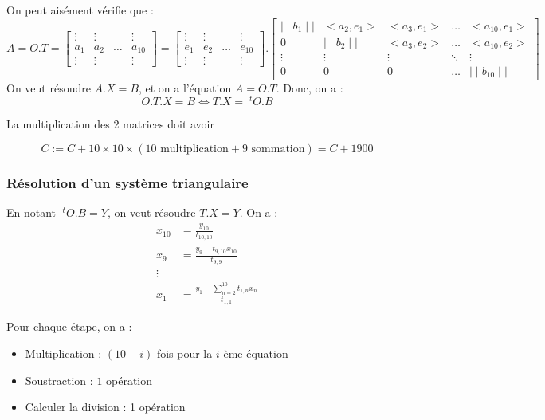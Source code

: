 \documentclass{article}
\begin{document}
On peut aisément vérifie que :
\[
    A = O.T  = \begin{bmatrix} \vdots & \vdots & & \vdots \\ a_1 & a_2 & \ldots & a_{10} \\ \vdots & \vdots & & \vdots \end{bmatrix} = \begin{bmatrix} \vdots & \vdots & & \vdots \\ e_1 & e_2 & \dots & e_{10} \\ \vdots & \vdots & & \vdots
    \end{bmatrix}.\begin{bmatrix}  \mid  \mid b_1 \mid  \mid & <a_2, e_1> & <a_3,e_1> &\ldots & <a_{10},e_1> \\ 0 &  \mid  \mid b_2  \mid  \mid  & <a_3, e_2> & \ldots & <a_{10}, e_2> \\ \vdots & \vdots & \vdots & \ddots & \vdots \\ 0 & 0 & 0 & \ldots &  \mid \mid  b_{10} \mid  \mid  \end{bmatrix} 
\]
On veut résoudre $A.X = B$, et on a l'équation  $A = O.T$. Donc, on a :
\[
    O.T.X = B \Leftrightarrow T.X = \;^tO.B
\]

La multiplication des 2 matrices doit avoir 
\begin{tcolorbox}
    \[
    C := C + 10 \times 10 \times (10 \text{ multiplication} + 9 \text{ sommation}) = C + 1900
\]
\end{tcolorbox}

\subsubsection{Résolution d'un système triangulaire}

En notant $\;^tO.B = Y$, on veut résoudre  $T.X = Y$. On a :
\begin{align*}
    x_{10} &= \frac{y_{10}}{t_{10,10}} \\
    x_9 &= \frac{y_9 - t_{9,10}x_{10}}{t_{9,9}} \\
    \vdots \\
    x_1 &= \frac{y_1 - \sum_{n=2}^{10} t_{1,n}x_n}{t_{1,1}}
\end{align*}

Pour chaque étape, on a :
\begin{itemize}
    \item Multiplication : $(10-i)$ fois pour la  $i$-ème équation
    \item Soustraction : $1$ opération
    \item Calculer la division : 1 opération
\end{itemize}
\end{document}
